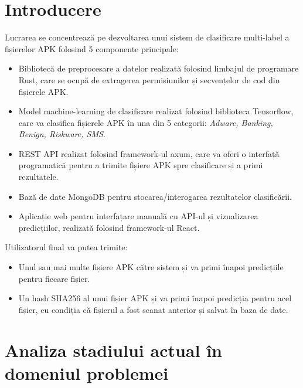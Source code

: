 \documentclass[12pt,a4paper]{report}
\begin{document}
\chapter{Introducere}
Lucrarea se concentrează pe dezvoltarea unui sistem de clasificare multi-label a fișierelor APK\cite{apk-file-format-wiki} folosind 5 componente principale:
\begin{itemize}
      \item Bibliotecă de preprocesare a datelor realizată folosind limbajul de programare Rust\cite{rustlang},
            care se ocupă de extragerea permisiunilor și secvențelor de cod din fișierele APK.
      \item Model machine-learning de clasificare realizat folosind biblioteca Tensorflow\cite{tensorflow2015-whitepaper},
            care va clasifica fișierele APK în una din 5 categorii: \textit{Adware, Banking, Benign, Riskware, SMS}.
      \item REST API realizat folosind framework-ul axum\cite{axum-framework},
            care va oferi o interfață programatică pentru a trimite fișiere APK spre clasificare și a primi rezultatele.
      \item Bază de date MongoDB\cite{mongodb} pentru stocarea/interogarea rezultatelor clasificării.
      \item Aplicație web pentru interfațare manuală cu API-ul și vizualizarea predicțiilor, realizată folosind framework-ul React\cite{react}.
\end{itemize}
Utilizatorul final va putea trimite:
\begin{itemize}
      \item Unul sau mai multe fișiere APK către sistem și va primi înapoi predicțiile pentru fiecare fișier.
      \item Un hash SHA256 al unui fișier APK și va primi înapoi predicția pentru acel fișier, cu condiția că fișierul a fost scanat anterior și salvat în baza de date.
\end{itemize}
\chapter{Analiza stadiului actual în domeniul problemei}
\end{document}
